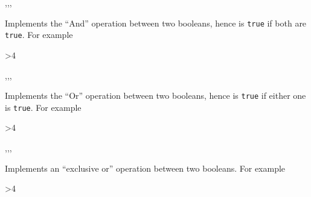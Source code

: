 \documentclass[oneside]{book}
\begin{document}
\begin{function}{\BoolVarAnd,\BoolVarAndT,\BoolVarAndF,\BoolVarAndTF}
\begin{syntax}
  
   
   
    
\end{syntax}
Implements the \enquote{And} operation between two booleans,
hence is \texttt{true} if both are \texttt{true}.
For example
\begin{demohigh}
 {>{4}} {} {}
\end{demohigh}
\end{function}

\begin{function}{\BoolVarOr,\BoolVarOrT,\BoolVarOrF,\BoolVarOrTF}
\begin{syntax}
  
   
   
    
\end{syntax}
Implements the \enquote{Or} operation between two booleans,
hence is \texttt{true} if either one is \texttt{true}.
For example
\begin{demohigh}
 {>{4}} {} {}
\end{demohigh}
\end{function}

\begin{function}{\BoolVarXor,\BoolVarXorT,\BoolVarXorF,\BoolVarXorTF}
\begin{syntax}
  
   
   
    
\end{syntax}
Implements an \enquote{exclusive or} operation between two booleans.
For example
\begin{demohigh}
 {>{4}} {} {}
\end{demohigh}
\end{function}
\end{document}

